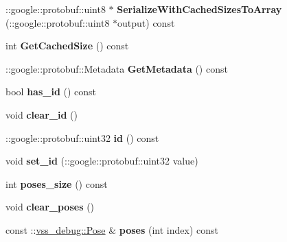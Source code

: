 \begin{DoxyCompactItemize}
\item 
\+::google\+::protobuf\+::uint8 $\ast$ {\bfseries Serialize\+With\+Cached\+Sizes\+To\+Array} (\+::google\+::protobuf\+::uint8 $\ast$output) const \hypertarget{classvss__debug_1_1Path_ab6c9b95723a6dd2ff9442f1847168203}{}\label{classvss__debug_1_1Path_ab6c9b95723a6dd2ff9442f1847168203}

\item 
int {\bfseries Get\+Cached\+Size} () const \hypertarget{classvss__debug_1_1Path_a9a15a0e1a293dea45bcef786785753bd}{}\label{classvss__debug_1_1Path_a9a15a0e1a293dea45bcef786785753bd}

\item 
\+::google\+::protobuf\+::\+Metadata {\bfseries Get\+Metadata} () const \hypertarget{classvss__debug_1_1Path_a9aafbd0797871b8ea923044b6277a188}{}\label{classvss__debug_1_1Path_a9aafbd0797871b8ea923044b6277a188}

\item 
bool {\bfseries has\+\_\+id} () const \hypertarget{classvss__debug_1_1Path_a10b1ade3ecf8332cceb1762c863f3a84}{}\label{classvss__debug_1_1Path_a10b1ade3ecf8332cceb1762c863f3a84}

\item 
void {\bfseries clear\+\_\+id} ()\hypertarget{classvss__debug_1_1Path_a7f8c54f2e48f33e65b9802232231f534}{}\label{classvss__debug_1_1Path_a7f8c54f2e48f33e65b9802232231f534}

\item 
\+::google\+::protobuf\+::uint32 {\bfseries id} () const \hypertarget{classvss__debug_1_1Path_a561076a78a98f14815cd5245ea0b3d12}{}\label{classvss__debug_1_1Path_a561076a78a98f14815cd5245ea0b3d12}

\item 
void {\bfseries set\+\_\+id} (\+::google\+::protobuf\+::uint32 value)\hypertarget{classvss__debug_1_1Path_a96f82bb5726c2ec167d34c62fb1fa771}{}\label{classvss__debug_1_1Path_a96f82bb5726c2ec167d34c62fb1fa771}

\item 
int {\bfseries poses\+\_\+size} () const \hypertarget{classvss__debug_1_1Path_a265cd42a7398bea0f8fa78387315abd6}{}\label{classvss__debug_1_1Path_a265cd42a7398bea0f8fa78387315abd6}

\item 
void {\bfseries clear\+\_\+poses} ()\hypertarget{classvss__debug_1_1Path_add4628d195201c373f523238dba91b1c}{}\label{classvss__debug_1_1Path_add4628d195201c373f523238dba91b1c}

\item 
const \+::\hyperlink{classvss__debug_1_1Pose}{vss\+\_\+debug\+::\+Pose} \& {\bfseries poses} (int index) const \hypertarget{classvss__debug_1_1Path_a84192302b9ccefcba6fa7fc7b1073bd8}{}\label{classvss__debug_1_1Path_a84192302b9ccefcba6fa7fc7b1073bd8}


\end{DoxyCompactItemize}
